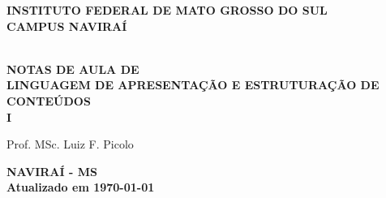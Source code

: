\thispagestyle{empty}

\vfill
 \begin{center}
    
    {\large\bfseries INSTITUTO FEDERAL DE MATO GROSSO DO SUL} \\
    
    {\large\bfseries CAMPUS NAVIRAÍ}  \\ 

    \vspace*{1in}

    \vspace*{4cm}
    \noindent \\
    
    \large\bfseries{NOTAS DE AULA DE} \\
    \huge\bfseries{LINGUAGEM DE APRESENTAÇÃO E ESTRUTURAÇÃO DE CONTEÚDOS} \\ I
    
    \vspace*{4cm}
    
    \large{Prof. MSc. Luiz F. Picolo}
    
    \vfill
    \large\bfseries{NAVIRAÍ - MS} \\ 
    \vspace{0.2cm}
    \small Atualizado em \today
\end{center}

\normalsize


